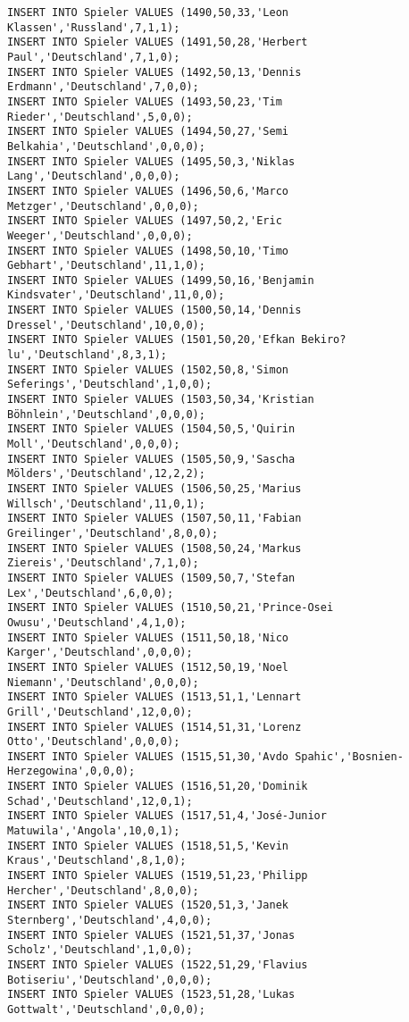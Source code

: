 \documentclass{lehramt-informatik-aufgabe}
\begin{document}
\begin{verbatim}
INSERT INTO Spieler VALUES (1490,50,33,'Leon Klassen','Russland',7,1,1);
INSERT INTO Spieler VALUES (1491,50,28,'Herbert Paul','Deutschland',7,1,0);
INSERT INTO Spieler VALUES (1492,50,13,'Dennis Erdmann','Deutschland',7,0,0);
INSERT INTO Spieler VALUES (1493,50,23,'Tim Rieder','Deutschland',5,0,0);
INSERT INTO Spieler VALUES (1494,50,27,'Semi Belkahia','Deutschland',0,0,0);
INSERT INTO Spieler VALUES (1495,50,3,'Niklas Lang','Deutschland',0,0,0);
INSERT INTO Spieler VALUES (1496,50,6,'Marco Metzger','Deutschland',0,0,0);
INSERT INTO Spieler VALUES (1497,50,2,'Eric Weeger','Deutschland',0,0,0);
INSERT INTO Spieler VALUES (1498,50,10,'Timo Gebhart','Deutschland',11,1,0);
INSERT INTO Spieler VALUES (1499,50,16,'Benjamin Kindsvater','Deutschland',11,0,0);
INSERT INTO Spieler VALUES (1500,50,14,'Dennis Dressel','Deutschland',10,0,0);
INSERT INTO Spieler VALUES (1501,50,20,'Efkan Bekiro?lu','Deutschland',8,3,1);
INSERT INTO Spieler VALUES (1502,50,8,'Simon Seferings','Deutschland',1,0,0);
INSERT INTO Spieler VALUES (1503,50,34,'Kristian Böhnlein','Deutschland',0,0,0);
INSERT INTO Spieler VALUES (1504,50,5,'Quirin Moll','Deutschland',0,0,0);
INSERT INTO Spieler VALUES (1505,50,9,'Sascha Mölders','Deutschland',12,2,2);
INSERT INTO Spieler VALUES (1506,50,25,'Marius Willsch','Deutschland',11,0,1);
INSERT INTO Spieler VALUES (1507,50,11,'Fabian Greilinger','Deutschland',8,0,0);
INSERT INTO Spieler VALUES (1508,50,24,'Markus Ziereis','Deutschland',7,1,0);
INSERT INTO Spieler VALUES (1509,50,7,'Stefan Lex','Deutschland',6,0,0);
INSERT INTO Spieler VALUES (1510,50,21,'Prince-Osei Owusu','Deutschland',4,1,0);
INSERT INTO Spieler VALUES (1511,50,18,'Nico Karger','Deutschland',0,0,0);
INSERT INTO Spieler VALUES (1512,50,19,'Noel Niemann','Deutschland',0,0,0);
INSERT INTO Spieler VALUES (1513,51,1,'Lennart Grill','Deutschland',12,0,0);
INSERT INTO Spieler VALUES (1514,51,31,'Lorenz Otto','Deutschland',0,0,0);
INSERT INTO Spieler VALUES (1515,51,30,'Avdo Spahic','Bosnien-Herzegowina',0,0,0);
INSERT INTO Spieler VALUES (1516,51,20,'Dominik Schad','Deutschland',12,0,1);
INSERT INTO Spieler VALUES (1517,51,4,'José-Junior Matuwila','Angola',10,0,1);
INSERT INTO Spieler VALUES (1518,51,5,'Kevin Kraus','Deutschland',8,1,0);
INSERT INTO Spieler VALUES (1519,51,23,'Philipp Hercher','Deutschland',8,0,0);
INSERT INTO Spieler VALUES (1520,51,3,'Janek Sternberg','Deutschland',4,0,0);
INSERT INTO Spieler VALUES (1521,51,37,'Jonas Scholz','Deutschland',1,0,0);
INSERT INTO Spieler VALUES (1522,51,29,'Flavius Botiseriu','Deutschland',0,0,0);
INSERT INTO Spieler VALUES (1523,51,28,'Lukas Gottwalt','Deutschland',0,0,0);

\end{verbatim}
\end{document}
